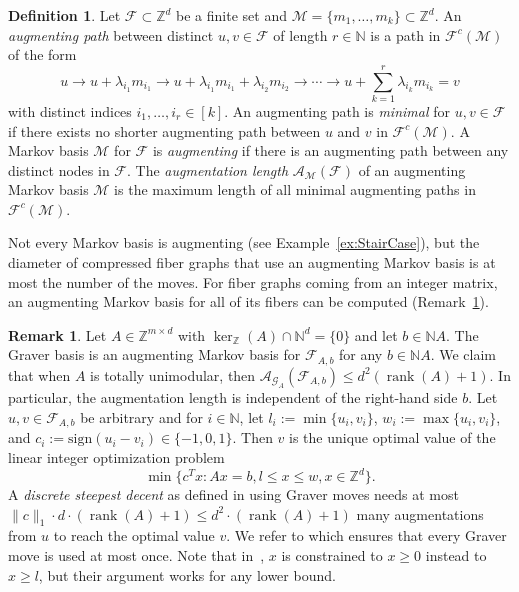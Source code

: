 \documentclass[11pt]{amsart}
\theoremstyle{definition}
\newtheorem{remark}[thm]{Remark}
\newtheorem{defn}[thm]{Definition}
\numberwithin{equation}{section}
\newcommand{\ring}[1]{\ensuremath{\mathbb{#1}}}
\renewcommand{\>}{\rangle}
\newcommand{\<}{\langle}
\newcommand{\0}{\mathbf{0}}
\newcommand{\1}{\mathbf{1}}
\newcommand{\2}{\mathbf{2}}
\newcommand\NN{\ring{N}}
\newcommand\ZZ{\ring{Z}}
\newcommand\cA{{\mathcal A}}
\newcommand\cF{{\mathcal F}}
\newcommand\cM{{\mathcal M}}
\DeclareMathOperator\rank{rank} %
\newcommand{\fiber}[2]{\mathcal{F}_{#1,#2}}
\newcommand{\auglen}[2]{\cA_{#1}(#2)}
\newcommand{\graver}[1]{\mathcal{G}_{#1}}
\newcommand\cone[1]{\NN#1}
\begin{document}
\begin{defn}\label{d:Augmentation}
Let $\cF\subset\ZZ^d$ be a finite set and
$\cM=\{m_1,\dots,m_k\}\subset\ZZ^d$. An \emph{augmenting path} between
distinct $u,v\in\cF$ of length $r\in\NN$ is a path in $\cF^c(\cM)$ of
the form
\begin{equation*}
u\to u+\lambda_{i_1}m_{i_1}\to u+\lambda_{i_1}m_{i_1}+\lambda_{i_2}m_{i_2}
\to\cdots \to u+\sum_{k=1}^r\lambda_{i_k}m_{i_k}=v
\end{equation*}
with distinct indices $i_1,\dots,i_r\in[k]$. An augmenting path is
\emph{minimal} for $u,v\in\cF$ if there exists no shorter augmenting
path between $u$ and $v$ in $\cF^c(\cM)$. 
A Markov basis $\cM$ for $\cF$ is \emph{augmenting} if there is an
augmenting path between any distinct nodes in $\cF$. The
\emph{augmentation length} $\auglen{\cM}{\cF}$ of an augmenting Markov
basis $\cM$ is the maximum length of all minimal augmenting paths in
$\cF^c(\cM)$.
\end{defn}

Not every Markov basis is augmenting (see Example~\ref{ex:StairCase}),
but the diameter of compressed fiber graphs that use an augmenting
Markov basis is at most the number of the moves. For fiber graphs
coming from an integer matrix, an augmenting Markov basis for all of its
fibers can be computed (Remark~\ref{r:GraverAugmentation}).


\begin{remark}\label{r:GraverAugmentation}
Let $A\in\ZZ^{m\times d}$  with $\ker_\ZZ(A)\cap\NN^d=\{0\}$ and let
$b\in\cone{A}$. The
Graver basis is an augmenting Markov basis for
$\fiber{A}{b}$ for any $b\in\cone{A}$. We claim that when $A$ is
totally unimodular, then $\auglen{\graver{A}}{\fiber{A}{b}}\le d^2(\rank(A)+1)$. In
particular, the augmentation length is independent of the right-hand
side $b$. Let $u,v\in\fiber{A}{b}$ be arbitrary and for $i\in\NN$, let
$l_i:=\min\{u_i,v_i\}$, $w_i:=\max\{u_i,v_i\}$, and
$c_i:=\mathrm{sign}(u_i-v_i)\in\{-1,0,1\}$.
Then $v$ is the unique optimal value of the linear integer optimization
problem
\begin{equation*}
\min\{c^Tx: Ax=b, l\le x\le w,x\in\ZZ^d\}.
\end{equation*}
A \emph{discrete steepest decent} as defined in
\cite[Definition~3]{loera-augmentation} using Graver moves needs at most
$\|c\|_1\cdot d\cdot(\rank(A)+1)\le d^2\cdot(\rank(A)+1)$ many
augmentations from $u$ to reach the optimal value $v$. We refer to 
\cite[Corollary~8]{loera-augmentation} which ensures that every Graver move is used
at most once. Note that in~\cite{loera-augmentation}, $x$ is constrained to
$x\ge 0$ instead to $x\ge l$, but their argument works for any lower
bound.
\end{remark}
\end{document}
